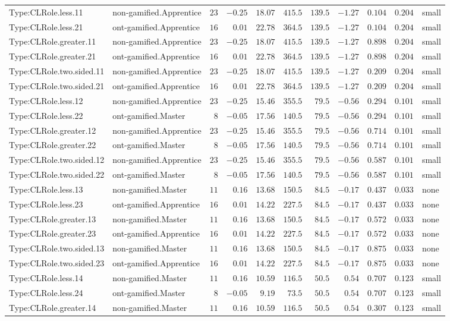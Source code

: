\documentclass[6pt,a4paper]{article}
\begin{document}
{\begin{longtable}{llrrrrrrrrl}
Type:CLRole.less.11&non-gamified.Apprentice&$23$&$-0.25$&$18.07$&$415.5$&$139.5$&$-1.27$&$0.104$&$0.204$&small\tabularnewline
Type:CLRole.less.21&ont-gamified.Apprentice&$16$&$ 0.01$&$22.78$&$364.5$&$139.5$&$-1.27$&$0.104$&$0.204$&small\tabularnewline
Type:CLRole.greater.11&non-gamified.Apprentice&$23$&$-0.25$&$18.07$&$415.5$&$139.5$&$-1.27$&$0.898$&$0.204$&small\tabularnewline
Type:CLRole.greater.21&ont-gamified.Apprentice&$16$&$ 0.01$&$22.78$&$364.5$&$139.5$&$-1.27$&$0.898$&$0.204$&small\tabularnewline
Type:CLRole.two.sided.11&non-gamified.Apprentice&$23$&$-0.25$&$18.07$&$415.5$&$139.5$&$-1.27$&$0.209$&$0.204$&small\tabularnewline
Type:CLRole.two.sided.21&ont-gamified.Apprentice&$16$&$ 0.01$&$22.78$&$364.5$&$139.5$&$-1.27$&$0.209$&$0.204$&small\tabularnewline
Type:CLRole.less.12&non-gamified.Apprentice&$23$&$-0.25$&$15.46$&$355.5$&$ 79.5$&$-0.56$&$0.294$&$0.101$&small\tabularnewline
Type:CLRole.less.22&ont-gamified.Master&$ 8$&$-0.05$&$17.56$&$140.5$&$ 79.5$&$-0.56$&$0.294$&$0.101$&small\tabularnewline
Type:CLRole.greater.12&non-gamified.Apprentice&$23$&$-0.25$&$15.46$&$355.5$&$ 79.5$&$-0.56$&$0.714$&$0.101$&small\tabularnewline
Type:CLRole.greater.22&ont-gamified.Master&$ 8$&$-0.05$&$17.56$&$140.5$&$ 79.5$&$-0.56$&$0.714$&$0.101$&small\tabularnewline
Type:CLRole.two.sided.12&non-gamified.Apprentice&$23$&$-0.25$&$15.46$&$355.5$&$ 79.5$&$-0.56$&$0.587$&$0.101$&small\tabularnewline
Type:CLRole.two.sided.22&ont-gamified.Master&$ 8$&$-0.05$&$17.56$&$140.5$&$ 79.5$&$-0.56$&$0.587$&$0.101$&small\tabularnewline
Type:CLRole.less.13&non-gamified.Master&$11$&$ 0.16$&$13.68$&$150.5$&$ 84.5$&$-0.17$&$0.437$&$0.033$&none\tabularnewline
Type:CLRole.less.23&ont-gamified.Apprentice&$16$&$ 0.01$&$14.22$&$227.5$&$ 84.5$&$-0.17$&$0.437$&$0.033$&none\tabularnewline
Type:CLRole.greater.13&non-gamified.Master&$11$&$ 0.16$&$13.68$&$150.5$&$ 84.5$&$-0.17$&$0.572$&$0.033$&none\tabularnewline
Type:CLRole.greater.23&ont-gamified.Apprentice&$16$&$ 0.01$&$14.22$&$227.5$&$ 84.5$&$-0.17$&$0.572$&$0.033$&none\tabularnewline
Type:CLRole.two.sided.13&non-gamified.Master&$11$&$ 0.16$&$13.68$&$150.5$&$ 84.5$&$-0.17$&$0.875$&$0.033$&none\tabularnewline
Type:CLRole.two.sided.23&ont-gamified.Apprentice&$16$&$ 0.01$&$14.22$&$227.5$&$ 84.5$&$-0.17$&$0.875$&$0.033$&none\tabularnewline
Type:CLRole.less.14&non-gamified.Master&$11$&$ 0.16$&$10.59$&$116.5$&$ 50.5$&$ 0.54$&$0.707$&$0.123$&small\tabularnewline
Type:CLRole.less.24&ont-gamified.Master&$ 8$&$-0.05$&$ 9.19$&$ 73.5$&$ 50.5$&$ 0.54$&$0.707$&$0.123$&small\tabularnewline
Type:CLRole.greater.14&non-gamified.Master&$11$&$ 0.16$&$10.59$&$116.5$&$ 50.5$&$ 0.54$&$0.307$&$0.123$&small\tabularnewline

\end{longtable}}
\end{document}
